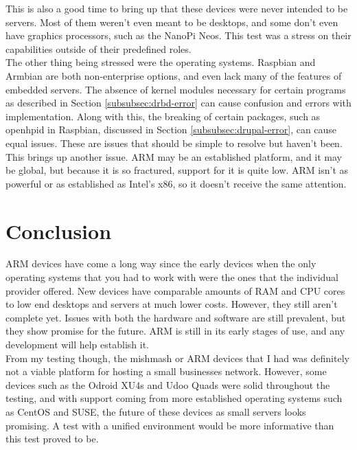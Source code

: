 \documentclass[12pt]{spieman}  %
\begin{document}
This is also a good time to bring up that these devices were never intended to be servers. Most of them weren't even meant to be desktops, and some don't even have graphics processors, such as the NanoPi Neos. This test was a stress on their capabilities outside of their predefined roles.\\

The other thing being stressed were the operating systems. Raspbian and Armbian are both non-enterprise options, and even lack many of the features of embedded servers. The absence of kernel modules necessary for certain programs as described in Section \ref{subsubsec:drbd-error} can cause confusion and errors with implementation. Along with this, the breaking of certain packages, such as openhpid in Raspbian, discussed in Section \ref{subsubsec:drupal-error}, can cause equal issues. These are issues that should be simple to resolve but haven't been.\\

This brings up another issue. ARM may be an established platform, and it may be global, but because it is so fractured, support for it is quite low. ARM isn't as powerful or as established as Intel's x86, so it doesn't receive the same attention.

\section{Conclusion}
\label{sec:conclusion}

ARM devices have come a long way since the early devices when the only operating systems that you had to work with were the ones that the individual provider offered. New devices have comparable amounts of RAM and CPU cores to low end desktops and servers at much lower costs. However, they still aren't complete yet. Issues with both the hardware and software are still prevalent, but they show promise for the future. ARM is still in its early stages of use, and any development will help establish it.\\

From my testing though, the mishmash or ARM devices that I had was definitely not a viable platform for hosting a small businesses network. However, some devices such as the Odroid XU4s and Udoo Quads were solid throughout the testing, and with support coming from more established operating systems such as CentOS and SUSE, the future of these devices as small servers looks promising. A test with a unified environment would be more informative than this test proved to be.\\
\end{document}
